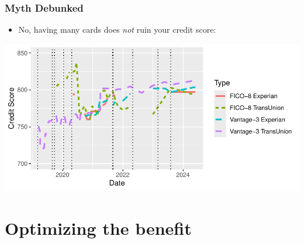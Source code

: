  \begin{frame}
    \frametitle{Myth Debunked}
    \begin{itemize}
        \item No, having many cards does \emph{not} ruin your credit score:
    \end{itemize}

    \begin{center}
        \includegraphics[width=\textwidth]{../Figures/CreditScoresTimeSeries.pdf}
    \end{center}    
\end{frame}    


\section{Optimizing the benefit}






